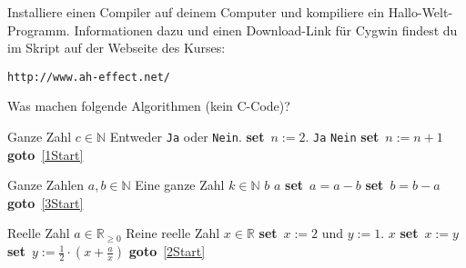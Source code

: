 \documentclass{uebungszettel}
\newcommand{\SET}{\textbf{set}\ }
\newcommand{\GOTO}{\textbf{goto}\ }
\begin{document}
\newcommand{\ah}[2]{\ \\* \emph{(#1, #2)}\\}

\begin{aufg}
Installiere einen Compiler auf deinem Computer und kompiliere ein Hallo-Welt-Programm. Informationen dazu und einen Download-Link für Cygwin findest du im Skript auf der Webseite des Kurses:
\begin{center}
	\verb|http://www.ah-effect.net/ |
\end{center}
\end{aufg}

\begin{aufg}
Was machen folgende Algorithmen (kein C-Code)?

\begin{algorithm}[H]
\caption{}
\begin{algorithmic}[1]
\REQUIRE Ganze Zahl $c\in\mathbb{N}$
\ENSURE Entweder \verb|Ja| oder \verb|Nein|.
\STATE \SET $n := 2$.
 \label{1Start}
\RETURN \verb|Ja|
\ENDIF
{}
\RETURN \verb|Nein|
\ENDIF
\STATE \SET $n := n + 1$
\STATE \GOTO \ref{1Start}
\end{algorithmic}
\end{algorithm}

\begin{algorithm}[H]
\caption{}
\begin{algorithmic}[1]
\REQUIRE Ganze Zahlen $a,b\in\mathbb{N}$
\ENSURE Eine ganze Zahl $k\in\mathbb{N}$
\RETURN $b$
\ENDIF
{} \label{3Start}
\RETURN $a$
\ENDIF
{}
\STATE \SET $a = a - b$
\ELSE 
\STATE \SET $b = b - a$
\ENDIF
\STATE \GOTO \ref{3Start}
\end{algorithmic}
\end{algorithm}

\begin{algorithm}[H]
\caption{}
\begin{algorithmic}[1]
\REQUIRE Reelle Zahl $a\in\mathbb{R}_{\ge 0}$
\ENSURE Reine reelle Zahl $x\in\mathbb{R}$
\STATE \SET $x := 2$ und $y := 1$.
 \label{2Start} 
\RETURN $x$
\ENDIF
\STATE \SET $x := y$
\STATE \SET $y := \frac{1}{2} \cdot \left(x+\frac{a}{x}\right)$
\STATE \GOTO \ref{2Start}
\end{algorithmic}
\end{algorithm}
\end{aufg}
\end{document}
